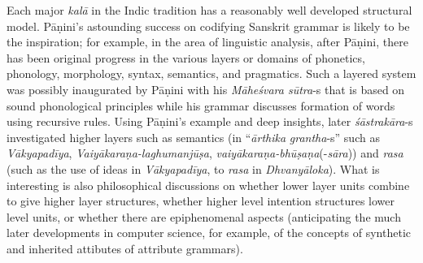 Each major \textsl{kalā} in the Indic tradition has a reasonably well developed structural model. Pāṇini’s astounding success on codifying Sanskrit grammar is likely to be the inspiration; for example, in the area of linguistic analysis, after Pāṇini, there has been original progress in the various layers or domains of phonetics, phonology, morphology, syntax, semantics, and pragmatics. Such a layered system was possibly inaugurated by Pāṇini with his \textsl{Māheśvara sūtra}-s that is based on sound phonological principles while his grammar discusses formation of words using recursive rules. Using Pāṇini’s example and deep insights, later \textsl{śāstrakāra}-s investigated higher layers such as semantics (in “\textsl{ārthika} \textsl{grantha}-s” such as \textsl{Vākyapadīya}, \textsl{Vaiyākaraṇa-laghumanjūṣa}, \textsl{vaiyākaraṇa-bhūṣaṇa}(-\textsl{sāra})) and \textsl{rasa} (such as the use of ideas in \textsl{Vākyapadīya}, to \textsl{rasa} in \textsl{Dhvanyāloka}). What is interesting is also philosophical discussions on whether lower layer units combine to give higher layer structures, whether higher level intention structures lower level units, or whether there are epiphenomenal aspects (anticipating the much later developments in computer science, for example, of the concepts of synthetic and inherited attibutes of attribute grammars).

\newpage

